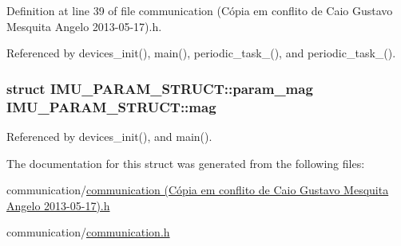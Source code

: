 Definition at line 39 of file communication (\-Cópia em conflito de Caio Gustavo Mesquita Angelo 2013-\/05-\/17).\-h.



Referenced by devices\-\_\-init(), main(), periodic\-\_\-task\-\_(), and periodic\-\_\-task\-\_().

\hypertarget{structIMU__PARAM__STRUCT_a26b277dcaf05f3842995df888225f6f4}{
\subsubsection[{mag}]{\setlength{\rightskip}{0pt plus 5cm}struct {\bf I\-M\-U\-\_\-\-P\-A\-R\-A\-M\-\_\-\-S\-T\-R\-U\-C\-T\-::param\-\_\-mag} I\-M\-U\-\_\-\-P\-A\-R\-A\-M\-\_\-\-S\-T\-R\-U\-C\-T\-::mag}}\label{structIMU__PARAM__STRUCT_a26b277dcaf05f3842995df888225f6f4}


Referenced by devices\-\_\-init(), and main().



The documentation for this struct was generated from the following files\-:\begin{DoxyCompactItemize}
\item 
communication/\hyperlink{communication_01_07C_xC3_xB3pia_01em_01conflito_01de_01Caio_01Gustavo_01Mesquita_01Angelo_012013-05-17_08_8h}{communication (\-Cópia em conflito de Caio Gustavo Mesquita Angelo 2013-\/05-\/17).\-h}\item 
communication/\hyperlink{communication_2communication_8h}{communication.\-h}\end{DoxyCompactItemize}

